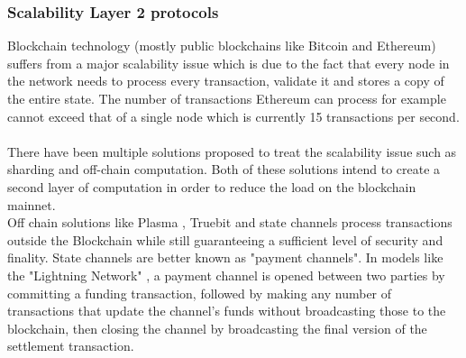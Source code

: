 \subsubsection{Scalability Layer 2 protocols}
Blockchain technology (mostly public blockchains like Bitcoin and Ethereum) suffers from a major scalability issue which is due to the fact that every node in the network needs to process every transaction, validate it and stores a copy of the entire state. The number of transactions Ethereum can process for example cannot exceed that of a single node which is currently 15 transactions per second.
\\~\\There have been multiple solutions proposed to treat the scalability issue such as sharding and off-chain computation. Both of these solutions intend to create a second layer of computation in order to reduce the load on the blockchain mainnet.
\\Off chain solutions like Plasma \cite{plasma}, Truebit \cite{truebit} and state channels process transactions outside the Blockchain while still guaranteeing a sufficient level of security and finality. State channels are better known as "payment channels". In models like the "Lightning Network" \cite{lightningnetwork}, a payment channel is opened between two parties by committing a funding transaction, followed by making any number of transactions that update the channel's funds without broadcasting those to the blockchain, then closing the channel by broadcasting the final version of the settlement transaction.
